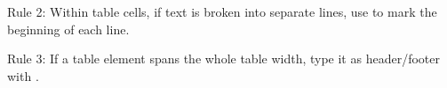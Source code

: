 

\vspace{3mm}
\begin{mainrule}
Rule 2: Within table cells, if text is broken into separate lines, use  to mark the beginning of each line.
\end{mainrule}

\vspace{3mm}
\begin{mainruleLessImportant}
Rule 3: If a table element spans the whole table width, type it as header/footer with .
\end{mainruleLessImportant}

